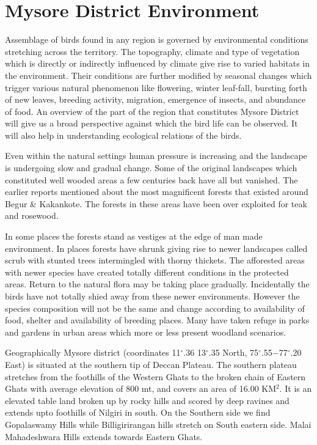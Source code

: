 \chapter{Mysore District Environment}

Assemblage of birds found in any region is governed by 
environmental conditions stretching across the territory. The 
topography, climate and type of vegetation which is directly or 
indirectly influenced by climate give rise to varied habitats in 
the environment. Their conditions are further modified by seasonal 
changes which trigger various natural phenomenon like flowering, 
winter leaf-fall, bursting forth of new leaves, breeding 
activity, migration, emergence of insects, and abundance of 
food. An overview of the part of the region that constitutes 
Mysore District will give us a broad perspective against which 
the bird life can be observed. It will also help in understanding 
ecological relations of the birds. 

Even within the natural settings human pressure is increasing 
and the landscape is undergoing slow and gradual change. Some 
of the original landscapes which constituted well wooded areas a 
few centuries back have all but vanished. The earlier reports 
mentioned about the most magnificent forests that existed around 
Begur \& Kakankote. The forests in these areas have been over exploited 
for teak and rosewood. 

In some places the forests stand as vestiges at the edge of 
man made environment. In places forests have shrunk giving rise 
to newer landscapes called scrub with stunted trees intermingled 
with thorny thickets. The afforested areas with newer species 
have created totally different conditions in the protected areas. 
Return to the natural flora may be taking place gradually. Incidentally 
the birds have not totally shied away from these newer 
environments. However the species composition will not be the 
same and change according to availability of food, shelter and 
availability of breeding places. Many have taken refuge in parks 
and gardens in urban areas which more or less present woodland 
scenarios. 

Geographically Mysore district (coordinates 11$^\circ$.36 13$^\circ$.35 
North, 75$^\circ$.55$-$77$^\circ$.20 East) is situated at the southern tip of 
Deccan Plateau. The southern plateau stretches from the foothills 
of the Western Ghats to the broken chain of Eastern Ghats with 
average elevation of 800 mt, and covers an area of 16.00 KM$^2$. It 
is an elevated table land broken up by rocky hills and scored by 
deep ravines and extends upto foothills of Nilgiri in south. On 
the Southern side we find Gopalaswamy Hills while Billigirirangan 
hills stretch on South eastern side. Malai Mahadeshwara Hills 
extends towards Eastern Ghats. 

